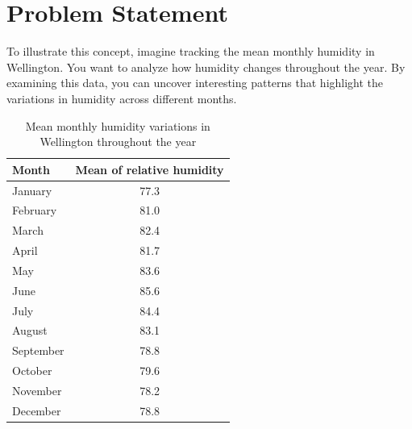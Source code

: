 

\section{Problem Statement}

To illustrate this concept, imagine tracking the mean monthly humidity in Wellington. You want to analyze how humidity changes throughout the year. By examining this data, you can uncover interesting patterns that highlight the variations in humidity across different months. 

\begin{table}[hbt]
	\centering
	\begin{tabular}{lc}
		\toprule
		Month & Mean of relative humidity \\
		\midrule
		January & 77.3 \\ 
		February & 81.0 \\
		March & 82.4 \\
		April & 81.7 \\
		May & 83.6 \\ 
		June & 85.6 \\
		July & 84.4 \\
		August & 83.1 \\ 
		September & 78.8 \\
		October & 79.6 \\
		November & 78.2 \\
		December & 78.8 \\
		\bottomrule
	\end{tabular}
	\caption{Mean monthly humidity variations in Wellington throughout the year}
	\label{tab:humidity}
\end{table}

